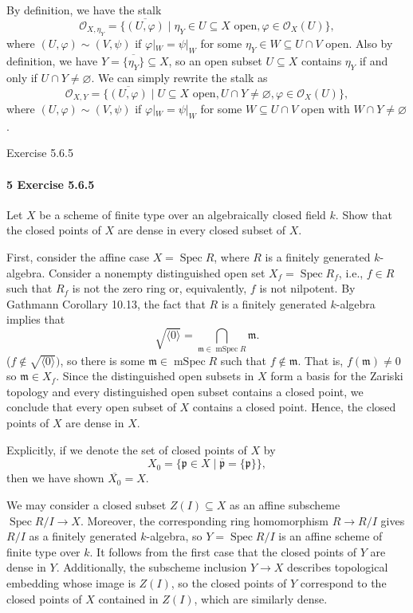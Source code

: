 \documentclass[12pt]{article}
\newlength{\myparskip}
\newenvironment{fullbox}{\begin{lrbox}{\savefullbox}\begin{minipage}{\dimexpr\textwidth-2\fboxsep\relax}\setlength{\parskip}{\myparskip}}{\end{minipage}\end{lrbox}\framebox[\textwidth]{\usebox{\savefullbox}}}
\newenvironment{pbox}[1][]{\begin{fullbox}\ifx#1\empty\else\paragraph{#1}\phantom{}\fi}{\end{fullbox}}
\theoremstyle{definition}
\renewcommand{\phi}{\varphi}
\renewcommand{\emptyset}{\varnothing}
\newcommand{\<}{\langle}
\renewcommand{\>}{\rangle}
\newcommand{\eqc}{\overline}
\newcommand{\clo}{\overline}
\DeclareMathOperator{\Spec}{Spec}
\DeclareMathOperator{\mSpec}{mSpec}
\renewcommand{\O}{\mathcal{O}}
\newcommand{\mm}{\mathfrak{m}}
\newcommand{\pp}{\mathfrak{p}}
\newcommand{\rad}{\sqrt}
\begin{document}
By definition, we have the stalk
\[
    \O_{X, \eta_Y} = \{\eqc{(U, \phi)} \mid \eta_Y \in U \subseteq X \text{ open}, \phi \in \O_X(U)\},
\]
where $(U, \phi) \sim (V, \psi)$ if $\phi|_W = \psi|_W$ for some $\eta_Y \in W \subseteq U \cap V$ open.
Also by definition, we have $Y = \clo{\{\eta_Y\}} \subseteq X$, so an open subset $U \subseteq X$ contains $\eta_Y$ if and only if $U \cap Y \ne \emptyset$.
We can simply rewrite the stalk as
\[
    \O_{X, Y} = \{\eqc{(U, \phi)} \mid U \subseteq X \text{ open}, U \cap Y \ne \emptyset, \phi \in \O_X(U)\},
\]
where $(U, \phi) \sim (V, \psi)$ if $\phi|_W = \psi|_W$ for some $W \subseteq U \cap V$ open with $W \cap Y \ne \emptyset$.

\newpage
\begin{pbox}[5 Exercise 5.6.5]
    Let $X$ be a scheme of finite type over an algebraically closed field $k$.
    Show that the closed points of $X$ are dense in every closed subset of $X$.
\end{pbox}


First, consider the affine case $X = \Spec R$, where $R$ is a finitely generated $k$-algebra.
Consider a nonempty distinguished open set $X_f = \Spec R_f$, i.e., $f \in R$ such that $R_f$ is not the zero ring or, equivalently, $f$ is not nilpotent.
By Gathmann Corollary 10.13, the fact that $R$ is a finitely generated $k$-algebra implies that
\[
    \rad{\<0\>} = \bigcap_{\mm \in \mSpec R} \mm.
\]
($f \notin \rad{\<0\>})$, so there is some $\mm \in \mSpec R$ such that $f \notin \mm$.
That is, $f(\mm) \ne 0$ so $\mm \in X_f$.
Since the distinguished open subsets in $X$ form a basis for the Zariski topology and every distinguished open subset contains a closed point, we conclude that every open subset of $X$ contains a closed point.
Hence, the closed points of $X$ are dense in $X$.

Explicitly, if we denote the set of closed points of $X$ by
\[
    X_0 = \{\pp \in X \mid \clo{\pp} = \{\pp\}\},
\]
then we have shown $\clo{X_0} = X$.

We may consider a closed subset $Z(I) \subseteq X$ as an affine subscheme $\Spec R/I \to X$.
Moreover, the corresponding ring homomorphism $R \to R/I$ gives $R/I$ as a finitely generated $k$-algebra, so $Y = \Spec R/I$ is an affine scheme of finite type over $k$.
It follows from the first case that the closed points of $Y$ are dense in $Y$.
Additionally, the subscheme inclusion $Y \to X$ describes topological embedding whose image is $Z(I)$, so the closed points of $Y$ correspond to the closed points of $X$ contained in $Z(I)$, which are similarly dense. 
\end{document}

